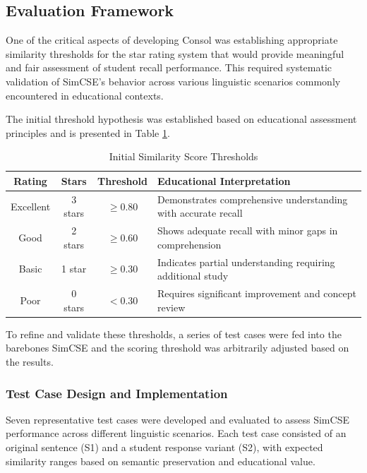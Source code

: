 {\subsection{Evaluation Framework}

One of the critical aspects of developing Consol was establishing appropriate similarity thresholds for the star rating system that would provide meaningful and fair assessment of student recall performance. This required systematic validation of SimCSE's behavior across various linguistic scenarios commonly encountered in educational contexts.

{\color{maroon}The initial threshold hypothesis was established based on educational assessment principles and is presented in Table \ref{tab:similarity_thresholds}.

\begin{table}[!htbp]
\centering
\caption[Initial Similarity Score Thresholds]{Initial Similarity Score Thresholds}
\label{tab:similarity_thresholds}
\begin{tabular}{|c|c|c|p{6cm}|}
\hline
\textbf{Rating} & \textbf{Stars} & \textbf{Threshold} & \textbf{Educational Interpretation} \\
\hline
Excellent & 3 stars & $\geq 0.80$ & Demonstrates comprehensive understanding with accurate recall \\
\hline
Good & 2 stars & $\geq 0.60$ & Shows adequate recall with minor gaps in comprehension \\
\hline
Basic & 1 star & $\geq 0.30$ & Indicates partial understanding requiring additional study \\
\hline
Poor & 0 stars & $< 0.30$ & Requires significant improvement and concept review \\
\hline
\end{tabular}
\end{table}
\FloatBarrier}

To refine and validate these thresholds, a series of test cases were fed into the barebones SimCSE and the scoring threshold was arbitrarily adjusted based on the results.

\subsubsection{Test Case Design and Implementation}

Seven representative test cases were developed and evaluated to assess SimCSE performance across different linguistic scenarios. Each test case consisted of an original sentence (S1) and a student response variant (S2), with expected similarity ranges based on semantic preservation and educational value.

}
